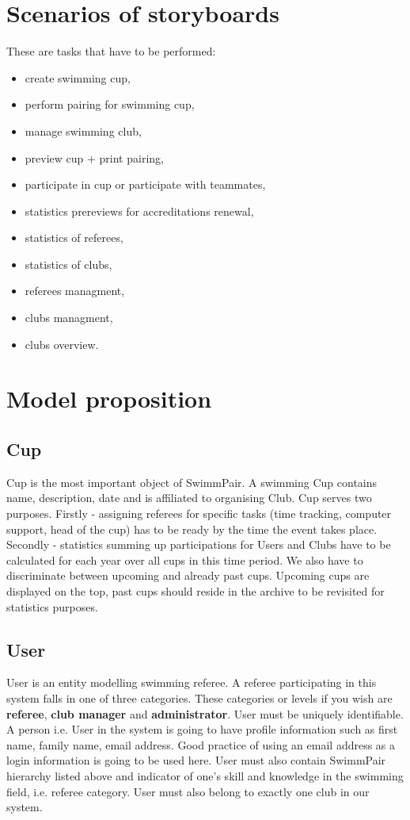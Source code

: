 \section{Scenarios of storyboards}
These are tasks that have to be performed:
\begin{itemize}
    \item create swimming cup,
    \item perform pairing for swimming cup,
    \item manage swimming club,
    \item preview cup + print pairing,
    \item participate in cup or participate with teammates,
    \item statistics prereviews for accreditations renewal,
    \item statistics of referees,
    \item statistics of clubs,
    \item referees managment,
    \item clubs managment,
    \item clubs overview.
  \end{itemize}
\section{Model proposition}

\par
\subsection*{Cup}
Cup is the most important object of SwimmPair. A swimming Cup contains name, description, date and is affiliated to organising Club. Cup serves two purposes. Firstly - assigning referees for specific tasks (time tracking, computer support, head of the cup) has to be ready by the time the event takes place. Secondly - statistics summing up participations for Users and Clubs have to be calculated for each year over all cups in this time period. We also have to discriminate between upcoming and already past cups. Upcoming cups are displayed on the top, past cups should reside in the archive to be revisited for statistics purposes.
\subsection*{User}
\par
User is an entity modelling swimming referee. A referee participating in this system falls in one of three categories. These categories or levels if you wish are \textbf{referee}, \textbf{club manager} and \textbf{administrator}. User must be uniquely identifiable. A person i.e. User in the system is going to have profile information such as first name, family name, email address. Good practice of using an email address as a login information is going to be used here. User must also contain SwimmPair hierarchy listed above and indicator of one's skill and knowledge in the swimming field, i.e. referee category. User must also belong to exactly one club in our system.
